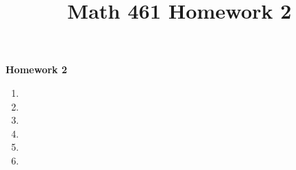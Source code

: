 \documentclass[oneside]{memoir}
\title{Math 461 Homework 2}
\begin{document}
\begin{center}
	\textbf{\large Homework 2} \\
\end{center}

\begin{enumerate}
	\item 
	\item 
	\item 
	\item 
	\item 
	\item 
\end{enumerate}
\end{document}
